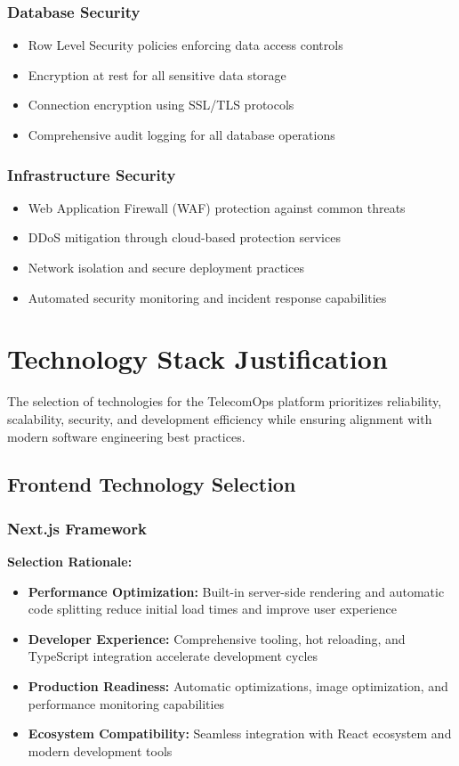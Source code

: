 \subsubsection{Database Security}
\begin{itemize}
\item Row Level Security policies enforcing data access controls
\item Encryption at rest for all sensitive data storage
\item Connection encryption using SSL/TLS protocols
\item Comprehensive audit logging for all database operations
\end{itemize}

\subsubsection{Infrastructure Security}
\begin{itemize}
\item Web Application Firewall (WAF) protection against common threats
\item DDoS mitigation through cloud-based protection services
\item Network isolation and secure deployment practices
\item Automated security monitoring and incident response capabilities
\end{itemize}

\section{Technology Stack Justification}

The selection of technologies for the TelecomOps platform prioritizes reliability, scalability, security, and development efficiency while ensuring alignment with modern software engineering best practices.

\subsection{Frontend Technology Selection}

\subsubsection{Next.js Framework}
\textbf{Selection Rationale:}
\begin{itemize}
\item \textbf{Performance Optimization:} Built-in server-side rendering and automatic code splitting reduce initial load times and improve user experience
\item \textbf{Developer Experience:} Comprehensive tooling, hot reloading, and TypeScript integration accelerate development cycles
\item \textbf{Production Readiness:} Automatic optimizations, image optimization, and performance monitoring capabilities
\item \textbf{Ecosystem Compatibility:} Seamless integration with React ecosystem and modern development tools
\end{itemize}

